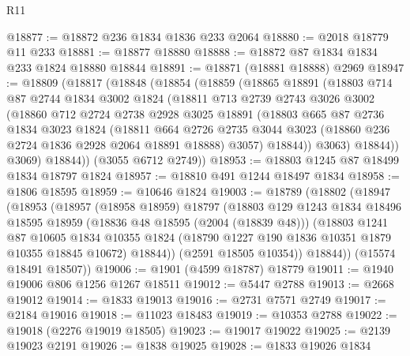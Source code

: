 \begin{lexlean}{R11}
\begin{coremodule}
@18877 := @18872 @236 @1834 @1836 @233 @2064
@18880 := @2018 @18779 @11 @233
@18881 := @18877 @18880
@18888 := @18872 @87 @1834 @1834 @233 @1824 @18880 @18844
@18891 := @18871 (@18881 @18888) @2969
@18947 := @18809
    (@18817
      (@18848
        (@18854
          (@18859
            (@18865
              @18891
              (@18803
                @714
                @87
                @2744
                @1834
                @3002
                @1824
                (@18811
                  @713
                  @2739
                  @2743
                  @3026
                  @3002
                  (@18860
                    @712
                    @2724
                    @2738
                    @2928
                    @3025
                    @18891
                    (@18803
                      @665
                      @87
                      @2736
                      @1834
                      @3023
                      @1824
                      (@18811
                        @664
                        @2726
                        @2735
                        @3044
                        @3023
                        (@18860 @236 @2724 @1836 @2928 @2064 @18891 @18888)
                        @3057)
                      @18844))
                  @3063)
                @18844))
            @3069)
          @18844))
      (@3055 @6712 @2749))
@18953 := @18803 @1245 @87 @18499 @1834 @18797 @1824
@18957 := @18810 @491 @1244 @18497 @1834
@18958 := @1806 @18595
@18959 := @10646 @1824
@19003 := @18789
    (@18802
      (@18947
        (@18953
          (@18957
            (@18958 @18959)
            @18797
            (@18803
              @129
              @1243
              @1834
              @18496
              @18595
              @18959
              (@18836 @48 @18595 (@2004 (@18839 @48)))
              (@18803
                @1241
                @87
                @10605
                @1834
                @10355
                @1824
                (@18790 @1227 @190 @1836 @10351 @1879 @10355 @18845 @10672)
                @18844))
            (@2591 @18505 @10354))
          @18844))
      (@15574 @18491 @18507))
@19006 := @1901 (@4599 @18787) @18779
@19011 := @1940 @19006 @806 @1256 @1267 @18511
@19012 := @5447 @2788
@19013 := @2668 @19012
@19014 := @1833 @19013
@19016 := @2731 @7571 @2749
@19017 := @2184 @19016
@19018 := @11023 @18483
@19019 := @10353 @2788
@19022 := @19018 (@2276 @19019 @18505)
@19023 := @19017 @19022
@19025 := @2139 @19023 @2191
@19026 := @1838 @19025
@19028 := @1833 @19026 @1834

\end{coremodule}
\end{lexlean}
